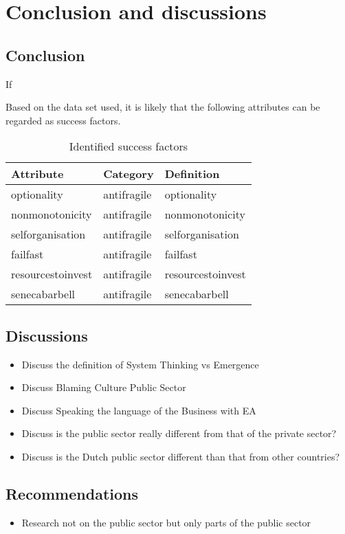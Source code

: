 \chapter{Conclusion and discussions}
\label{ch:conclusionanddiscussions}






\section{Conclusion}
\label{sec:conclusion}
If 

Based on the data set used, it is likely that the following attributes can be regarded as success factors.

\begin{table}[H]
	\begin{center}
			\begin{tabular}{p{}p{}p{}}
				\textbf{Attribute} & \textbf{Category} & \textbf{Definition} \\%
				\midrule%
				\Gls{optionality} & \Gls{antifragile} & \Glsdesc*{optionality} \\%
				\Gls{nonmonotonicity} & \Gls{antifragile} & \Glsdesc*{nonmonotonicity} \\%
				\Gls{selforganisation} & \Gls{antifragile} & \Glsdesc*{selforganisation} \\%
				\Gls{failfast} & \Gls{antifragile} & \Glsdesc*{failfast} \\%
				\Gls{resourcestoinvest} & \Gls{antifragile} & \Glsdesc*{resourcestoinvest} \\%
				\Gls{senecabarbell} & \Gls{antifragile} & \Glsdesc*{senecabarbell} \\%
				\bottomrule%
			\end{tabular}
		\caption{Identified success factors}
	\end{center}
\end{table}

\section{Discussions}
\label{sec:discussions}

\begin{itemize}
	\item{Discuss the definition of System Thinking vs Emergence}
	\item{Discuss Blaming Culture Public Sector}
	\item{Discuss Speaking the language of the Business with EA}
	\item{Discuss is the public sector really different from that of the private sector?}
	\item{Discuss is the Dutch public sector different than that from other countries?}
\end{itemize}

\section{Recommendations}
\label{sec:reccomandations}

\begin{itemize}
	\item{Research not on the public sector but only parts of the public sector}
\end{itemize}